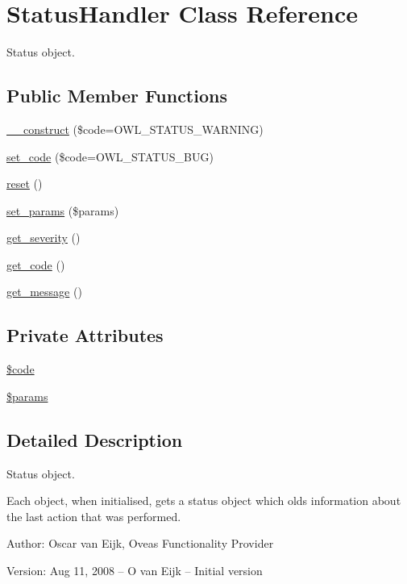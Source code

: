 \hypertarget{classStatusHandler}{
\section{StatusHandler Class Reference}
\label{classStatusHandler}
}
Status object.  


\subsection*{Public Member Functions}
\begin{CompactItemize}
\item 
\hyperlink{classStatusHandler_5cb2ad461aa4afc7ec9115c176eb354e}{\_\-\_\-construct} (\$code=OWL\_\-STATUS\_\-WARNING)
\item 
\hyperlink{classStatusHandler_748d462386322a552aa798f951258c91}{set\_\-code} (\$code=OWL\_\-STATUS\_\-BUG)
\item 
\hyperlink{classStatusHandler_8b0a327d3272ae49032a596518d47164}{reset} ()
\item 
\hyperlink{classStatusHandler_c35544d3ad8a435f69db0965ed674428}{set\_\-params} (\$params)
\item 
\hyperlink{classStatusHandler_32c76648dd45915d1be9b78bebc410b1}{get\_\-severity} ()
\item 
\hyperlink{classStatusHandler_d39bc4e6a56b6d418a252957da9b4417}{get\_\-code} ()
\item 
\hyperlink{classStatusHandler_79170bca79bfd82e3f707e1294e7c916}{get\_\-message} ()
\end{CompactItemize}
\subsection*{Private Attributes}
\begin{CompactItemize}
\item 
\hyperlink{classStatusHandler_b74e826d2401345eb20b11fe7d78aa45}{\$code}
\item 
\hyperlink{classStatusHandler_599f9c9284340399fdcb7dac9cb7856f}{\$params}
\end{CompactItemize}


\subsection{Detailed Description}
Status object. 

Each object, when initialised, gets a status object which olds information about the last action that was performed. \begin{Desc}
\item[Author:]Oscar van Eijk, Oveas Functionality Provider \end{Desc}
\begin{Desc}
\item[Version:]Aug 11, 2008 -- O van Eijk -- Initial version \end{Desc}



